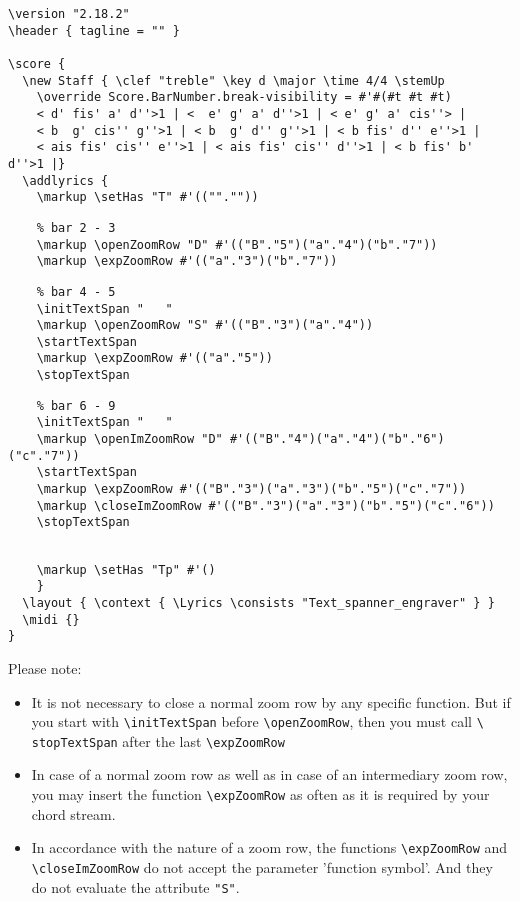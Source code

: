\documentclass[
  DIV=calc,
  BCOR=5mm,
  12pt,
  headings=small,
  oneside,
  abstract=true,
  toc=bib,
  xcolor=dvipsnames,
  openany,
  ngerman,english]{scrartcl}
\begin{document}
\begin{scriptsize}
\begin{verbatim}
\version "2.18.2"
\header { tagline = "" }

\score {
  \new Staff { \clef "treble" \key d \major \time 4/4 \stemUp 
    \override Score.BarNumber.break-visibility = #'#(#t #t #t)
    < d' fis' a' d''>1 | <  e' g' a' d''>1 | < e' g' a' cis''> |
    < b  g' cis'' g''>1 | < b  g' d'' g''>1 | < b fis' d'' e''>1 | 
    < ais fis' cis'' e''>1 | < ais fis' cis'' d''>1 | < b fis' b' d''>1 |}
  \addlyrics { 
    \markup \setHas "T" #'((""."")) 
\end{verbatim}
\color{red}
\begin{verbatim} 
    % bar 2 - 3
    \markup \openZoomRow "D" #'(("B"."5")("a"."4")("b"."7"))
    \markup \expZoomRow #'(("a"."3")("b"."7")) 
\end{verbatim}
\color{blue}
\begin{verbatim} 
    % bar 4 - 5
    \initTextSpan "   "
    \markup \openZoomRow "S" #'(("B"."3")("a"."4"))
    \startTextSpan
    \markup \expZoomRow #'(("a"."5")) 
    \stopTextSpan
\end{verbatim}
\color{magenta}
\begin{verbatim} 
    % bar 6 - 9
    \initTextSpan "   "
    \markup \openImZoomRow "D" #'(("B"."4")("a"."4")("b"."6")("c"."7"))
    \startTextSpan
    \markup \expZoomRow #'(("B"."3")("a"."3")("b"."5")("c"."7")) 
    \markup \closeImZoomRow #'(("B"."3")("a"."3")("b"."5")("c"."6")) 
    \stopTextSpan 
\end{verbatim}
\color{black}
\begin{verbatim} 
        
    \markup \setHas "Tp" #'() 
    }
  \layout { \context { \Lyrics \consists "Text_spanner_engraver" } }
  \midi {}
}
\end{verbatim}
\end{scriptsize}

Please note:
\begin{itemize}
  \item It is not necessary to close a normal zoom row by any specific function.
  But if you start with \texttt{\textbackslash initTextSpan} before
  \texttt{\textbackslash openZoomRow}, then you must call \texttt{\textbackslash
  stopTextSpan} after the last \texttt{\textbackslash expZoomRow}
  \item In case of a normal zoom row as well as in case of an intermediary zoom
  row, you may insert the function \texttt{\textbackslash expZoomRow} as often as
  it is required by your chord stream.
  \item In accordance with the nature of a zoom row, the functions
  \texttt{\textbackslash expZoomRow} and \texttt{\textbackslash closeImZoomRow}
  do not accept the parameter 'function symbol'. And they do not evaluate the
  attribute \texttt{"S"}.
\end{itemize}
\end{document}
